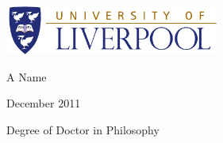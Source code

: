 \documentclass[a4paper,12pt]{article}
\begin{document}
\LARGE

    \begin{center}
      \setlength{\parskip}{0pt}
    \includegraphics[width=7cm]{./Figures/logoc}
    
    \bigskip    
      \bigskip      
      \bigskip  
      \bigskip      
      
 	A Name
            \bigskip      
\bigskip  
            \bigskip
            
            December 2011
      \bigskip
      \bigskip      
\bigskip  
      
      {\large Degree of Doctor in Philosophy }

\end{center}
\thispagestyle{empty}
 
\end{document}
